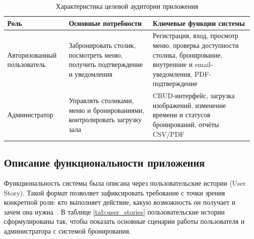 \begin{table}[H]
    \centering
    \caption{Характеристика целевой аудитории приложения}
    \label{tab:audience}
    \begin{tabular}{|L{45mm}|L{52mm}|L{50mm}|}
        \hline
        \centering\textbf{Роль} &
        \centering\textbf{Основные потребности} &
        \centering\arraybackslash\textbf{Ключевые функции системы} \\
        \hline
        Авторизованный пользователь &
        Забронировать столик, посмотреть меню, получить подтверждение и уведомления &
        Регистрация, вход, просмотр меню, проверка доступности столика, бронирование, внутренние и email-уведомления, PDF-подтверждение \\
        \hline
        Администратор &
        Управлять столиками, меню и бронированиями, контролировать загрузку зала &
        CRUD-интерфейс, загрузка изображений, изменение времени и статусов бронирований, отчёты CSV/PDF \\
        \hline
    \end{tabular}
\end{table}

\subsection{Описание функциональности приложения}
\label{subsec:functionality}

Функциональность системы была описана через пользовательские истории
(User Story). Такой формат позволяет зафиксировать требование с точки
зрения конкретной роли: кто выполняет действие, какую возможность он
получает и зачем она нужна~\cite{cohn_userstories}. В таблице
\ref{tab:user_stories} пользовательские истории сформулированы так,
чтобы показать основные сценарии работы пользователя и администратора
с системой бронирования.

